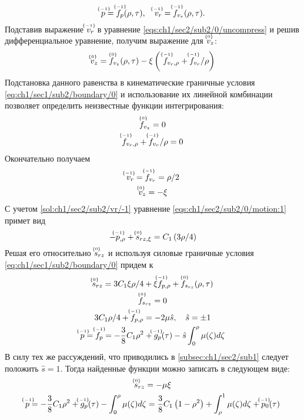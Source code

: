 \begin{equation*}
  \uindex{p}{-1} = \uindex{f}{-1}_{p}(\rho, \tau), \quad \uindex{v}{-1}_{r} = \uindex{f}{-1}_{v_{r}}(\rho, \tau).
\end{equation*}
Подставив выражение $\uindex{v}{-1}_{r}$ в уравнение \cref{eqs:ch1/sec2/sub2/0/uncompress} и решив дифференциальное уравнение, получим выражение для $\uindex{v}{0}_{z}$:
\begin{equation*}
  \uindex{v}{0}_{z} = \uindex{f}{0}_{v_{z}}(\rho, \tau) -\xi \left(\ \uindex{f}{-1}_{v_{r},\rho} + \uindex{f}{-1}_{v_{r}} / \rho\right)
\end{equation*}
Подстановка данного равенства в кинематические граничные условия \cref{eq:ch1/sec1/sub2/boundary/0} и использование их линейной комбинации позволяет определить неизвестные функции интегрирования:
\begin{gather*}
  \uindex{f}{0}_{v_{z}} = 0
  \\
  \uindex{f}{-1}_{v_{r},\rho} + \uindex{f}{-1}_{v_{r}} / \rho = 0
\end{gather*}
Окончательно получаем
\begin{gather}
  \label{sol:ch1/sec2/sub2/vr/-1}
  \uindex{v}{-1}_{r} = \uindex{f}{-1}_{v_{r}} = \rho / 2
  \\
  \label{sol:ch1/sec2/sub2/vz/0}
  \uindex{v}{0}_{z} =  -\xi
\end{gather}
С учетом \cref{sol:ch1/sec2/sub2/vr/-1} уравнение \cref{eqs:ch1/sec2/sub2/0/motion:1} примет вид
\begin{equation*}
  -\uindex{p}{-1}_{,\rho}+\uindex{s}{0}_{rz,\xi} = C_1 \left(3 \rho / 4\right)
\end{equation*}
Решая его относительно $\uindex{s}{0}_{rz}$ и используя силовые граничные условия \cref{eq:ch1/sec1/sub2/boundary/0} придем к
\begin{gather*}
  \uindex{s}{0}_{rz} = 3 C_1 \xi \rho / 4 + \xi \uindex{f}{-1}_{p,\rho} + \uindex{f}{0}_{s_{rz}}(\rho, \tau)
  \\
  \uindex{f}{0}_{s_{rz}} = 0
  \\
  3 C_1 \rho / 4 + \uindex{f}{-1}_{p,\rho} = -2 \mu \hat{s}, \quad \hat{s} = \pm 1
  \\
  \uindex{p}{-1} = \uindex{f}{-1}_{p} = - \frac{3}{8}C_1\rho^2 + \uindex{g}{-1}_{p}(\tau) - \hat{s} \int_0^\rho \mu(\zeta)d\zeta
\end{gather*}
В силу тех же рассуждений, что приводились в \ref{subsec:ch1/sec2/sub1} следует положить $\hat{s} = 1$. Тогда найденные функции можно записать в следующем виде:
\begin{gather}
  \label{sol:ch1/sec2/sub2/srz/0}
  \uindex{s}{0}_{rz} = -\mu \xi
  \\
  \label{sol:ch1/sec2/sub2/p/-1}
  \uindex{p}{-1} = - \frac{3}{8}C_1\rho^2 + \uindex{g}{-1}_{p}(\tau) - \int_0^\rho \mu(\zeta)d\zeta = \frac{3}{8}C_1\left(1-\rho^2\right) + \int_\rho^1 \mu(\zeta)d\zeta + \uindex{p}{-1}_{0}(\tau)
\end{gather}
